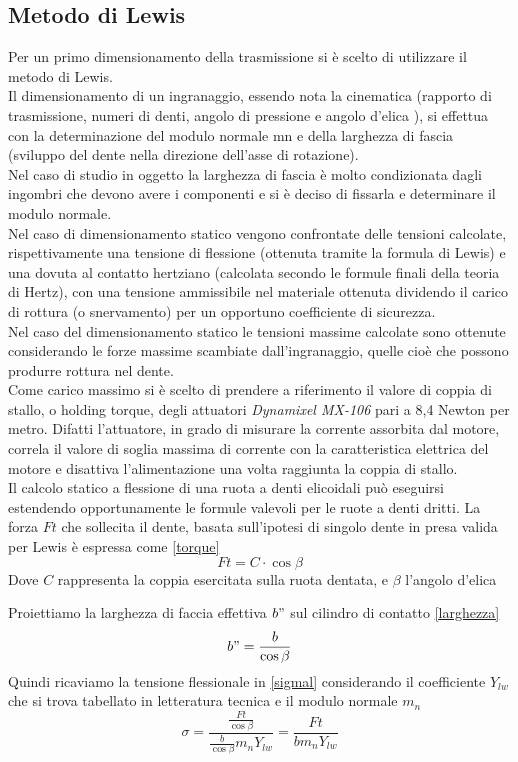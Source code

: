 \documentclass[%
corpo=11pt,
twoside,
 stile=classica,
oldstyle,
greek,%
]{toptesi}
\begin{document}
	\subsection{Metodo di Lewis}
	Per un primo dimensionamento della trasmissione si è scelto di utilizzare il metodo di Lewis. \\
	Il dimensionamento di un ingranaggio, essendo nota la cinematica (rapporto di trasmissione, numeri di denti, angolo di pressione 
	 e angolo d’elica ), si effettua con la determinazione del modulo normale mn e della larghezza di fascia (sviluppo del dente nella
	direzione dell’asse di rotazione).\\
	 Nel caso di studio in oggetto la larghezza di fascia è molto condizionata dagli ingombri che devono avere i componenti e si è deciso di fissarla e determinare il modulo normale. \\
	Nel caso di dimensionamento statico vengono confrontate delle tensioni calcolate, rispettivamente una tensione di flessione (ottenuta tramite la formula di Lewis) e una dovuta al contatto hertziano (calcolata secondo le formule finali della teoria di Hertz), con una tensione ammissibile nel materiale ottenuta dividendo il carico di rottura (o snervamento) per un opportuno coefficiente di sicurezza. \\
	Nel caso del dimensionamento statico le tensioni massime calcolate sono ottenute considerando le forze massime scambiate dall’ingranaggio, quelle cioè che possono produrre rottura nel dente.\\
	Come carico massimo si è scelto di prendere a riferimento il valore di coppia di stallo, o holding torque, degli attuatori \textit{Dynamixel MX-106} pari a 8,4 Newton per metro. Difatti l'attuatore, in grado di misurare la corrente assorbita dal motore, correla il valore di soglia massima di corrente con la caratteristica elettrica del motore e disattiva l'alimentazione una volta raggiunta la coppia di stallo. \\
	Il calcolo statico a flessione di una ruota a denti elicoidali può eseguirsi estendendo opportunamente le formule valevoli per le ruote a denti dritti.
	La forza $Ft$  che sollecita il dente, basata sull'ipotesi di singolo dente in presa valida per Lewis è espressa come \ref{torque}
	\begin{equation}\label{torque}
	Ft=C \cdot \cos\beta
	\end{equation}
	Dove $C$ rappresenta la coppia esercitata sulla ruota dentata, e $\beta$ l'angolo d'elica

	Proiettiamo la larghezza di faccia effettiva $b"$ sul cilindro di contatto \ref{larghezza}
	\begin{equation}\label{larghezza}
	b"=\frac{b}{\cos\beta}
	\end{equation}	
	Quindi ricaviamo la tensione flessionale in \ref{sigmal} considerando il coefficiente $Y_{lw}$ che si trova tabellato in letteratura tecnica e il modulo normale $m_{n}$
	\begin{equation}\label{sigmal}
	\sigma=\frac{\frac{Ft}{\cos\beta}}{\frac{b}{\cos\beta}m_{n}Y_{lw}}=\frac{Ft}{b m_{n}Y_{lw}}
	\end{equation}
	
\end{document}
